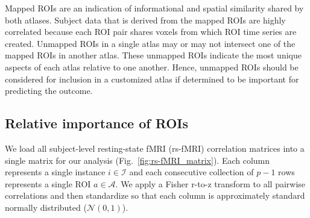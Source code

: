 \documentclass[10pt,letterpaper]{article}\usepackage[]{graphicx}\usepackage[]{color}
\begin{document}
Mapped ROIs are an indication of informational and spatial similarity shared by both atlases. Subject data that is derived from the mapped ROIs are highly correlated because each ROI pair shares voxels from which ROI time series are created. Unmapped ROIs in a single atlas may or may not intersect one of the mapped ROIs in another atlas. These unmapped ROIs indicate the most unique aspects of each atlas relative to one another. Hence, unmapped ROIs should be considered for inclusion in a customized atlas if determined to be important for predicting the outcome.

\subsection{Relative importance of ROIs}

We load all subject-level resting-state fMRI (rs-fMRI) correlation matrices into a single matrix for our analysis (Fig.~\ref{fig:rs-fMRI_matrix}). Each column represents a single instance $i \in \mathcal{I}$ and each consecutive collection of $p-1$ rows represents a single ROI $a \in \mathcal{A}$. We apply a Fisher r-to-z transform to all pairwise correlations and then standardize so that each column is approximately standard normally distributed ($\mathcal{N}(0,1)$).

\bigskip
\end{document}
